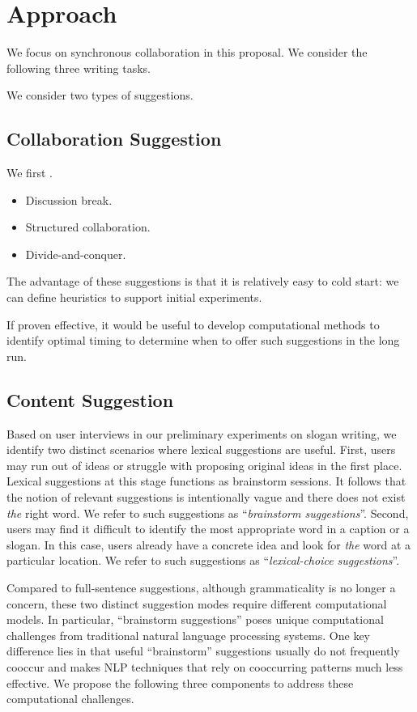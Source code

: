 
\section{Approach}

We focus on synchronous collaboration in this proposal. 
We consider the following three writing tasks.

We consider two types of suggestions.

\subsection{Collaboration Suggestion}

We first .

\begin{itemize}
    \item Discussion break.
    \item Structured collaboration.
    \item Divide-and-conquer.
\end{itemize}

The advantage of these suggestions is that it is relatively easy to cold start: 
we can define heuristics to support initial experiments.

If proven effective, it would be useful to develop computational methods to identify optimal timing to determine when to offer such suggestions in the long run.

\subsection{Content Suggestion}


Based on user interviews in our preliminary experiments on slogan writing, we identify two distinct scenarios where lexical suggestions are useful.
First, users may run out of ideas or struggle with proposing original ideas in the first place.
Lexical suggestions at this stage functions as brainstorm sessions.
It follows that the notion of relevant suggestions is intentionally vague and there does not exist {\em the} right word.
We refer to such suggestions as ``{\em brainstorm suggestions}''.
Second, users may find it difficult to identify the most appropriate word in a caption or a slogan.
In this case, users already have a concrete idea and look for {\em the} word at a particular location.
We refer to such suggestions as ``{\em lexical-choice suggestions}''.

Compared to full-sentence suggestions, although grammaticality is no longer a concern, these two distinct suggestion modes require different computational models.
In particular, ``brainstorm suggestions'' poses unique computational challenges from traditional natural language processing systems.
One key difference lies in that useful ``brainstorm'' suggestions usually do not frequently cooccur and makes NLP techniques that rely on cooccurring patterns much less effective.
We propose the following three components to address these computational challenges.

